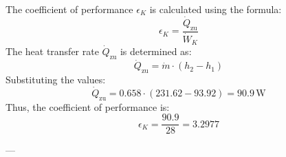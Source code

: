 The coefficient of performance \( \epsilon_K \) is calculated using the formula:  
\[
\epsilon_K = \frac{\dot{Q}_{\text{zu}}}{\dot{W}_K}
\]  
The heat transfer rate \( \dot{Q}_{\text{zu}} \) is determined as:  
\[
\dot{Q}_{\text{zu}} = \dot{m} \cdot (h_2 - h_1)
\]  
Substituting the values:  
\[
\dot{Q}_{\text{zu}} = 0.658 \cdot (231.62 - 93.92) = 90.9 \, \text{W}
\]  
Thus, the coefficient of performance is:  
\[
\epsilon_K = \frac{90.9}{28} = 3.2977
\]  

---